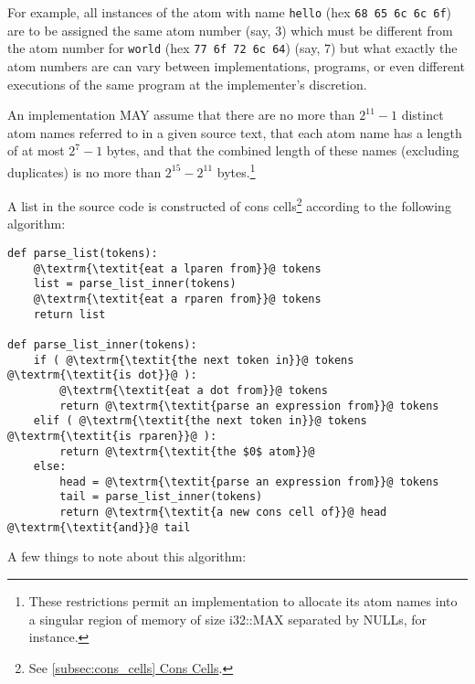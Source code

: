 \documentclass[twocolumn]{report}
\newcommand{\intralink}[2]{\hyperref[#1]{\ref*{#1} #2}}
\begin{document}
For example, all instances of the atom with name \texttt{hello} (hex \texttt{68 65 6c 6c 6f}) are to be assigned the same atom number (say, $3$) which must be different from the atom number for \texttt{world} (hex \texttt{77 6f 72 6c 64}) (say, $7$) but what exactly the atom numbers are can vary between implementations, programs, or even different executions of the same program at the implementer's discretion.

An implementation MAY assume that there are no more than $2^{11} - 1$ distinct atom names referred to in a given source text, that each atom name has a length of at most $2^7 - 1$ bytes, and that the combined length of these names (excluding duplicates) is no more than $2^{15} - 2^{11}$ bytes.\footnote{These restrictions permit an implementation to allocate its atom names into a singular region of memory of size i32::MAX separated by NULLs, for instance.}

\clearpage

A list in the source code is constructed of cons cells\footnote{See \intralink{subsec:cons_cells}{Cons Cells}.} according to the following algorithm:

\begin{verbatim}
def parse_list(tokens):
    @\textrm{\textit{eat a lparen from}}@ tokens
    list = parse_list_inner(tokens)
    @\textrm{\textit{eat a rparen from}}@ tokens
    return list

def parse_list_inner(tokens):
    if ( @\textrm{\textit{the next token in}}@ tokens @\textrm{\textit{is dot}}@ ):
        @\textrm{\textit{eat a dot from}}@ tokens
        return @\textrm{\textit{parse an expression from}}@ tokens
    elif ( @\textrm{\textit{the next token in}}@ tokens @\textrm{\textit{is rparen}}@ ):
        return @\textrm{\textit{the $0$ atom}}@
    else:
        head = @\textrm{\textit{parse an expression from}}@ tokens
        tail = parse_list_inner(tokens)
        return @\textrm{\textit{a new cons cell of}}@ head @\textrm{\textit{and}}@ tail
\end{verbatim}

A few things to note about this algorithm:
\end{document}
